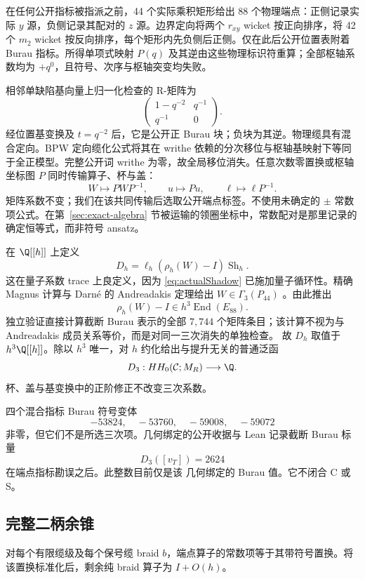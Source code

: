 在任何公开指标被指派之前，44 个实际乘积矩形给出
88 个物理端点：正侧记录实际 $y$ 源，负侧记录其配对的 $z$ 源。边界定向将两个
$r_{xy}$ wicket 按正向排序，将 42 个 $m_2$ wicket 按反向排序，每个矩形内先负侧后正侧。仅在此后公开位置表附着 Burau 指标。所得单项式映射 $P(q)$ 及其逆由这些物理标识符重算；全部枢轴系数均为
$+q^0$，且符号、次序与枢轴突变均失败。

相邻单缺陷基向量上归一化检查的 R-矩阵为
\[
\begin{pmatrix}1-q^{-2}&q^{-1}\\q^{-1}&0\end{pmatrix}.
\]
经位置基变换及 $t=q^{-2}$ 后，它是公开正 Burau 块；负块为其逆。物理缆具有混合定向。BPW 定向缆化公式将其在 writhe 依赖的分次移位与枢轴基映射下等同于全正模型。完整公开词 writhe 为零，故全局移位消失。任意次数零置换或枢轴坐标图 $P$ 同时传输算子、杯与盖：
\[
W\mapsto PWP^{-1},\qquad u\mapsto Pu,\qquad
\ell\mapsto\ell P^{-1}.
\]
矩阵系数不变；我们在该共同传输后选取公开端点标签。不使用未确定的 $\pm$ 常数项公式。在第~\ref{sec:exact-algebra} 节被运输的领圈坐标中，常数配对是那里记录的确定恒等式，而非符号 ansatz。

在 $\Q[[h]]$ 上定义
\[
D_h=\ell_h(\rho_h(W)-I)\operatorname{Sh}_h.
\]
这在量子系数 trace 上良定义，因为 \eqref{eq:actualShadow} 已施加量子循环性。精确 Magnus 计算与 Darn\'e 的 Andreadakis 定理给出 $W\in\Gamma_3(P_{44})$ \cite[Theorem~6.2]{Darne2021}。由此推出
\[
\rho_h(W)-I\in h^3\operatorname{End}(E_{88}).
\]
独立验证直接计算截断 Burau 表示的全部 $7{,}744$ 个矩阵条目；该计算不视为与 Andreadakis 成员关系等价，而是对同一三次消失的单独检查。
故 $D_h$ 取值于 $h^3\Q[[h]]$。除以 $h^3$ 唯一，对 $h$ 约化给出与提升无关的普通泛函
\[
D_3:HH_0(\mathcal C;M_R)\longrightarrow\Q.
\]
杯、盖与基变换中的正阶修正不改变三次系数。

四个混合指标 Burau 符号变体
\[
-53824,\quad -53760,\quad -59008,\quad -59072
\]
非零，但它们不是所选三次项。几何绑定的公开收据与
Lean 记录截断 Burau 标量
\begin{equation}\label{eq:selectedD3}
D_3([v_T])=2624
\end{equation}
在端点指标勘误之后。此整数目前仅是该
几何绑定的 Burau 值。它不闭合 C 或 S。

\subsection{完整二柄余锥}

\begin{lemma}[全缆常数项]\label{lem:C2}
对每个有限缆级及每个保号缆 braid \(b\)，端点算子的常数项等于其带符号置换。将该置换标准化后，剩余纯 braid 算子为 \(I+O(h)\)。
\end{lemma}

